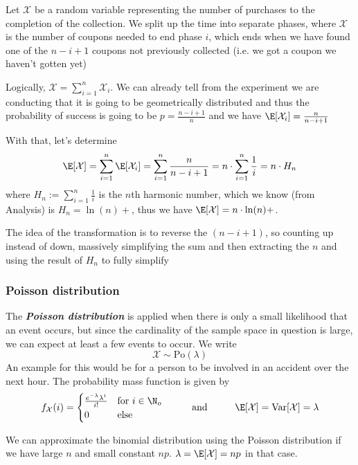 Let $\mathcal{X}$ be a random variable representing the number of purchases to the completion of the collection. We split up the time into separate phases, where $\mathcal{X}$ is the number of coupons needed to end phase $i$, which ends when we have found one of the $n - i + 1$ coupons not previously collected (i.e. we got a coupon we haven't gotten yet)

Logically, $\mathcal{X} = \sum_{i = 1}^{n} \mathcal{X}_i$. We can already tell from the experiment we are conducting that it is going to be geometrically distributed and thus the probability of success is going to be $p = \frac{n - i + 1}{n}$ and we have $\E[\mathcal{X}_i] = \frac{n}{n - i + 1}$

With that, let's determine
\[
    \E[\mathcal{X}] = \sum_{i = 1}^{n} \E[\mathcal{X}_i] = \sum_{i = 1}^{n} \frac{n}{n - i + 1} = n \cdot \sum_{i = 1}^{n} \frac{1}{i} = n \cdot H_n
\]
where $H_n := \sum_{i = 1}^{n} \frac{1}{i}$ is the $n$th harmonic number, which we know (from Analysis) is $H_n = \ln(n) +$, thus we have $\E[\mathcal{X}] = n \cdot \ln(n) +$.

The idea of the transformation is to reverse the $(n - i + 1)$, so counting up instead of down, massively simplifying the sum and then extracting the $n$ and using the result of $H_n$ to fully simplify


\subsubsection{Poisson distribution}
The \textbf{\textit{Poisson distribution}} is applied when there is only a small likelihood that an event occurs, but since the cardinality of the sample space in question is large, we can expect at least a few events to occur.
We write
\[
    \mathcal{X} \sim \text{Po}(\lambda)
\]
An example for this would be for a person to be involved in an accident over the next hour. The probability mass function is given by
\[
    f_{\mathcal{X}}(i) = \begin{cases}
        \frac{e^{-\lambda}\lambda^i}{i!} & \text{for } i \in \N_o \\
        0                                & \text{else}
    \end{cases}
    \hspace{1cm} \text{and} \hspace{1cm} \E[\mathcal{X}] = \text{Var}[\mathcal{X}] = \lambda
\]


We can approximate the binomial distribution using the Poisson distribution if we have large $n$ and small constant $np$. $\lambda = \E[\mathcal{X}] = np$ in that case.
